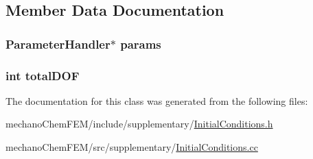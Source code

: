 \subsection{Member Data Documentation}
\subsubsection[{params}]{\setlength{\rightskip}{0pt plus 5cm}Parameter\-Handler$\ast$ params}\label{class_initial_conditions_a31d5e7a5228d9d55ba00fae854fcfaa0}
\subsubsection[{total\-D\-O\-F}]{\setlength{\rightskip}{0pt plus 5cm}int total\-D\-O\-F}\label{class_initial_conditions_acf5f14c806d215a0bf5c9f46d3e23607}


The documentation for this class was generated from the following files\-:\begin{DoxyCompactItemize}
\item 
mechano\-Chem\-F\-E\-M/include/supplementary/\hyperlink{_initial_conditions_8h}{Initial\-Conditions.\-h}\item 
mechano\-Chem\-F\-E\-M/src/supplementary/\hyperlink{_initial_conditions_8cc}{Initial\-Conditions.\-cc}\end{DoxyCompactItemize}
